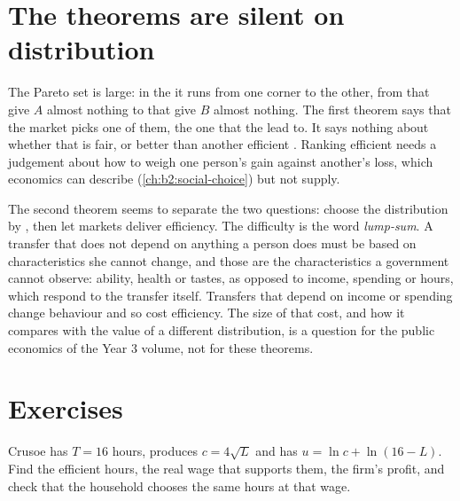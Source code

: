 \section{The theorems are silent on distribution}\label{sec:b2:welfare-theorems:distribution}

The Pareto set is large: in the  it runs from one corner to the other, from  that
give $A$ almost nothing to  that give $B$ almost nothing. The first theorem says that the
market picks one of them, the one that the  lead to. It says nothing about whether that
 is fair, or better than another efficient . Ranking efficient  needs a
judgement about how to weigh one person's gain against another's loss, which economics can describe
(\cref{ch:b2:social-choice}) but not supply.

The second theorem seems to separate the two questions: choose the distribution by ,
then let markets deliver efficiency. The difficulty is the word \emph{lump-sum}. A transfer that does not
depend on anything a person does must be based on characteristics she cannot change, and those are the
characteristics a government cannot observe: ability, health or tastes, as opposed to income, spending or
hours, which respond to the transfer itself. Transfers that depend on income or spending change behaviour
and so cost efficiency. The size of that cost, and how it compares with the value of a different
distribution, is a question for the public economics of the Year 3 volume, not for these theorems.

\section{Exercises}\label{sec:b2:welfare-theorems:exercises}

\begin{exercise}[$\star$]\label{exo:b2:welfare-theorems:1}
Crusoe has $T = 16$ hours, produces $c = 4\sqrt L$ and has $u = \ln c + \ln(16 - L)$. Find the efficient
hours, the real wage that supports them, the firm's profit, and check that the household chooses the same
hours at that wage.
\end{exercise}

